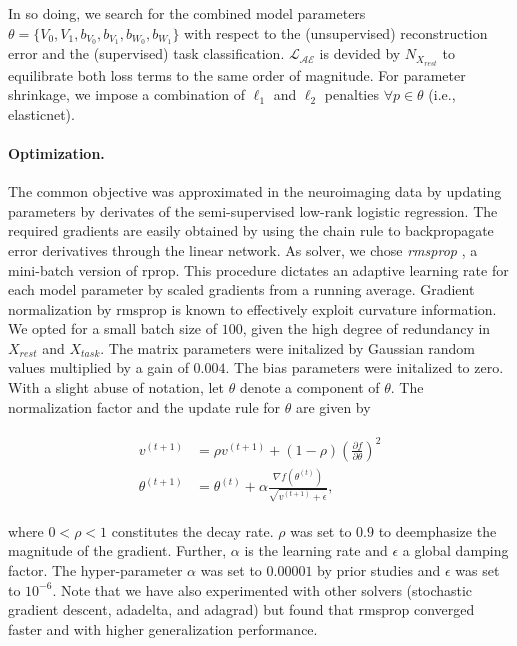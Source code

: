 \documentclass{article} %
\begin{document}
In so doing, we search for the combined model parameters
$\theta=\{V_0,V_1,b_{V_0}, b_{V_1}, b_{W_0}, b_{W_1}\}$
with respect to the (unsupervised) reconstruction error and the
(supervised) task classification.
${\mathcal{L_{AE}}}$ is devided by ${N_{X_{rest}}}$ to equilibrate both
loss terms to the same order of magnitude.
For parameter shrinkage, we
impose a combination of $\ell_1$ and $\ell_2$ penalties
$\forall p \in \theta$ (i.e., elasticnet).

\paragraph{Optimization.}
The common objective was approximated 
in the neuroimaging data
by updating parameters by derivates 
of the 
semi-supervised low-rank logistic regression.
The required gradients are easily obtained by using the chain rule to
backpropagate error derivatives through the linear network.
As solver, we chose \textit{rmsprop} \cite{rmsprop},
a mini-batch version of rprop.
This procedure dictates an adaptive learning rate
for each model parameter by
scaled gradients from a running average.
Gradient normalization by rmsprop
is known to effectively exploit curvature information.
We opted for a small batch size of $100$, given the high degree of
redundancy in $X_{rest}$ and $X_{task}$.
The matrix parameters were initalized by Gaussian random values multiplied
by a gain of $0.004$. The bias parameters were initalized to zero.
With a slight abuse of notation, let $\theta$ denote a component of $\theta$.
The normalization factor and the update rule for $\theta$
are given by

\begin{eqnarray}
  \begin{split}
v^{(t+1)} &= \rho v^{(t+1)} + (1 - \rho)\left(\frac{\partial f}{\partial \theta}\right)^2
\\
\theta^{(t+1)} &= \theta^{(t)} + \alpha \frac{\nabla f(\theta^{(t)})}{\sqrt{v^{(t+1)} + \epsilon}},
  \end{split}
\end{eqnarray}

where $0 < \rho < 1$ constitutes the decay rate. $\rho$ was set to
$0.9$ to deemphasize the magnitude of the gradient.
Further, $\alpha$ is the learning rate and $\epsilon$ a global damping factor.
The hyper-parameter $\alpha$ was set to $0.00001$ by prior studies and $\epsilon$ was set to $10^{-6}$.
%
Note that we have also experimented with other solvers
(stochastic gradient descent, adadelta, and adagrad) but found that
rmsprop converged faster and with higher generalization performance.
\end{document}
